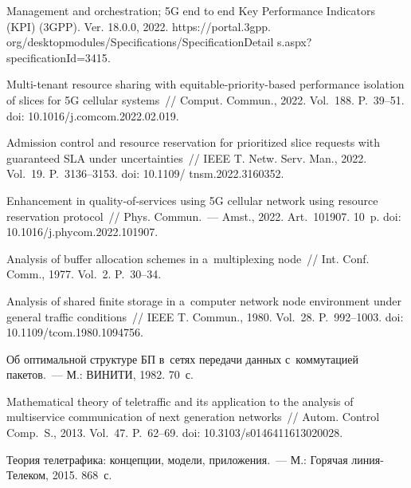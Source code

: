 \begin{multicols}{2}
{{\begin{thebibliography}{99}
 Management and 
orchestration; 5G end to end Key Performance Indicators (KPI) (3GPP). Ver. 
18.0.0, 2022. 
{\sf https://portal.3gpp. org/desktopmodules/Specifications/SpecificationDetail s.aspx?specificationId=3415}.

 Multi-tenant resource sharing with equitable-priority-based 
performance isolation of slices for 5G cellular systems~// Comput. Commun., 
2022. Vol.~188. P.~39--51. doi: 10.1016/j.comcom.2022.02.019.



 Admission control and 
resource reservation for prioritized slice requests with guaranteed SLA under 
uncertainties~// IEEE T. Netw. Serv. Man., 2022. Vol.~19. P.~3136--3153. 
doi: 10.1109/ tnsm.2022.3160352.

Enhancement in quality-of-services using 5G cellular network 
using resource reservation protocol~// Phys. Commun.~--- Amst., 2022. Art.~101907. 10~p. doi: 
10.1016/j.phycom.2022.101907.







 Analysis of 
buffer allocation schemes in a~multiplexing node~// Int. Conf. 
Comm., 1977. Vol.~2. P.~30--34.

 Analysis of shared finite 
storage in a~computer network node environment under general traffic conditions~// 
IEEE T. Commun., 1980. Vol.~28. P.~992--1003. doi: 
10.1109/tcom.1980.1094756.

 Об оптимальной 
структуре БП в~сетях передачи данных с~коммутацией пакетов.~--- М.: ВИНИТИ, 
1982. 70~с.


Mathematical theory of teletraffic and its application to the analysis of 
multiservice communication of next generation networks~// Autom. Control Comp.~S., 2013. Vol.~47. P.~62--69. doi: 10.3103/s0146411613020028.





 Теория телетрафика: концепции, модели, 
приложения.~--- М.: Горячая лин\-ия-Телеком, 2015. 868~с.


\end{thebibliography}}}
\end{multicols}
